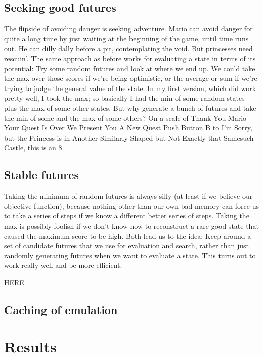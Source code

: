 \documentclass[twocolumn]{article}
\begin{document}
\subsection{Seeking good futures}

The flipside of avoiding danger is seeking adventure. Mario can avoid
danger for quite a long time by just waiting at the beginning of the
game, until time runs out. He can dilly dally before a pit,
contemplating the void. But princesses need rescuin'. The same
approach as before works for evaluating a state in terms of its
potential: Try some random futures and look at where we end up. We
could take the max over those scores if we're being optimistic, or the
average or sum if we're trying to judge the general value of the
state. In my first version, which did work pretty well, I took the
max; so basically I had the min of some random states plus the max of
some other states. But why generate a bunch of futures and take the
min of some and the max of some others? On a scale of Thank You Mario
Your Quest Is Over We Present You A New Quest Push Button B to I'm
Sorry, but the Princess is in Another Similarly-Shaped but Not Exactly
that Samesuch Castle, this is an 8.

\subsection{Stable futures}

Taking the minimum of random futures is always silly (at least if we
believe our objective function), because nothing other than our own
bad memory can force us to take a series of steps if we know a
different better series of steps. Taking the max is possibly foolish
if we don't know how to reconstruct a rare good state that caused the
maximum score to be high. Both lead us to the idea: Keep around
a set of candidate futures that we use for evaluation and search,
rather than just randomly generating futures when we want to evaluate
a state. This turns out to work really well and be more efficient.

HERE

\subsection{Caching of emulation}



\section{Results}
\end{document}
